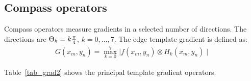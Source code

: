 \subsection{Compass operators}
Compass operators measure gradients in a selected number of directions.
The directions are $\Theta_k = k {\pi \over 4}$,  $k = 0,...,7$. The edge
template gradient is defined as:
\begin{eqnarray}
G(x_m, y_n) = \max_{k=0}^7 { \mid f(x_m, y_n) \otimes H_k(x_m, y_n) \mid }
\end{eqnarray}

Table~\ref{tab_grad2} shows the principal template gradient operators.

\begin{table}[htb]
\begin{center} 


\end{center}
\end{table}
